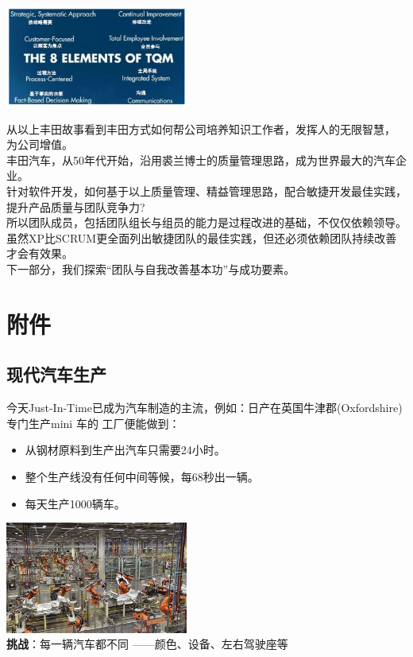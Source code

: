 \includegraphics[width=6cm]{TQM_12.png}

从以上丰田故事看到丰田方式如何帮公司培养知识工作者，发挥人的无限智慧，
为公司增值。\\
丰田汽车，从50年代开始，沿用裘兰博士的质量管理思路，成为世界最大的汽车企业。\\
针对软件开发，如何基于以上质量管理、精益管理思路，配合敏捷开发最佳实践，提升产品质量与团队竞争力?\\
所以团队成员，包括团队组长与组员的能力是过程改进的基础，不仅仅依赖领导。\\
虽然XP比SCRUM更全面列出敏捷团队的最佳实践，但还必须依赖团队持续改善才会有效果。\\
下一部分，我们探索``团队与自我改善基本功''与成功要素。

\hypertarget{ux9644ux4ef6}{%
\section{附件}\label{ux9644ux4ef6}}

\hypertarget{ux73b0ux4ee3ux6c7dux8f66ux751fux4ea7}{%
\subsection{现代汽车生产}\label{ux73b0ux4ee3ux6c7dux8f66ux751fux4ea7}}

今天Just-In-Time已成为汽车制造的主流，例如：日产在英国牛津郡(Oxfordshire)专门生产mini
车的 工厂便能做到：

\begin{itemize}
\tightlist
\item
  从钢材原料到生产出汽车只需要24小时。
\item
  整个生产线没有任何中间等候，每68秒出一辆。
\item
  每天生产1000辆车。
\end{itemize}

\includegraphics[width=6cm]{NissanRobots-OIPh8UAC7FBjlaCmA_mBepJjQHaEi.jpg}\\
\textbf{挑战}：每一辆汽车都不同 ------颜色、设备、左右驾驶座等

